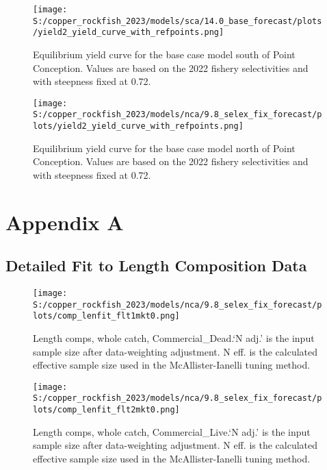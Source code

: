 \documentclass[11pt,
  english,
  letterpaper,
]{article}
\begin{document}
\pagebreak

\begin{figure}
\centering
\texttt{[image: S:/copper\_rockfish\_2023/models/sca/14.0\_base\_forecast/plots/yield2\_yield\_curve\_with\_refpoints.png]}
\caption{Equilibrium yield curve for the base case model south of Point Conception. Values are based on the 2022 fishery selectivities and with steepness fixed at 0.72.\label{fig:yield-south}}
\end{figure}

\pagebreak

\begin{figure}
\centering
\texttt{[image: S:/copper\_rockfish\_2023/models/nca/9.8\_selex\_fix\_forecast/plots/yield2\_yield\_curve\_with\_refpoints.png]}
\caption{Equilibrium yield curve for the base case model north of Point Conception. Values are based on the 2022 fishery selectivities and with steepness fixed at 0.72.\label{fig:yield-north}}
\end{figure}

\pagebreak

\hypertarget{detailed-fit-comps}{%
\section{Appendix A}\label{detailed-fit-comps}}

\hypertarget{length-data}{%
\subsection{Detailed Fit to Length Composition Data}\label{length-data}}

\begin{figure}
\centering
\texttt{[image: S:/copper\_rockfish\_2023/models/nca/9.8\_selex\_fix\_forecast/plots/comp\_lenfit\_flt1mkt0.png]}
\caption{Length comps, whole catch, Commercial\_Dead.`N adj.' is the input sample size after data-weighting adjustment. N eff. is the calculated effective sample size used in the McAllister-Ianelli tuning method.\label{fig:comp_lenfit_flt1mkt0}}
\end{figure}

\begin{figure}
\centering
\texttt{[image: S:/copper\_rockfish\_2023/models/nca/9.8\_selex\_fix\_forecast/plots/comp\_lenfit\_flt2mkt0.png]}
\caption{Length comps, whole catch, Commercial\_Live.`N adj.' is the input sample size after data-weighting adjustment. N eff. is the calculated effective sample size used in the McAllister-Ianelli tuning method.\label{fig:comp_lenfit_flt2mkt0}}
\end{figure}
\end{document}
